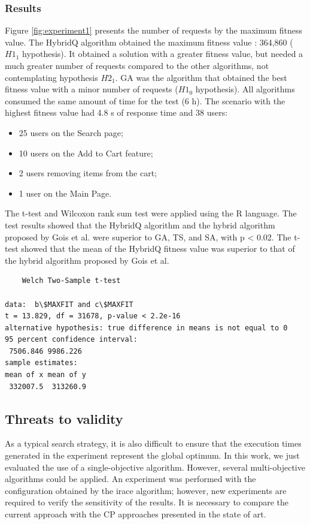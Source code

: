 \documentclass{bmcart}
\begin{document}
\subsubsection{Results}

Figure \ref{fig:experiment1} presents the number of requests by the maximum fitness value. The HybridQ algorithm obtained the maximum fitness value : 364,860 ($H1_{1}$ hypothesis). It obtained a solution with a greater fitness value, but needed a much greater number of requests compared to the other algorithms, not contemplating hypothesis $H2_{1}$. GA was the algorithm that obtained the best fitness value with a minor number of requests ($H1_{0}$ hypothesis). All algorithms consumed the same amount of time for the test (6 h). The scenario with the highest fitness value had 4.8 s of response time and 38 users:

\begin{itemize}
\item 25 users on the Search page;
\item 10 users on the Add to Cart feature;
\item 2 users removing items from the cart;
\item 1 user on the Main Page. 
\end{itemize}

The t-test and Wilcoxon rank sum test were applied using the R language. The test results showed that the HybridQ algorithm and the hybrid algorithm proposed by Gois et al. were superior to GA, TS, and SA, with p < 0.02. The t-test showed that the mean of the HybridQ fitness value was superior to that of the hybrid algorithm proposed by Gois et al.

\begin{lstlisting}
	Welch Two-Sample t-test

data:  b\$MAXFIT and c\$MAXFIT
t = 13.829, df = 31678, p-value < 2.2e-16
alternative hypothesis: true difference in means is not equal to 0
95 percent confidence interval:
 7506.846 9986.226
sample estimates:
mean of x mean of y 
 332007.5  313260.9 

\end{lstlisting}



\subsection{Threats to validity}

As a typical search strategy, it is also difficult to ensure that the execution times generated in the experiment represent the global optimum. In this work, we just evaluated the use of a single-objective algorithm. However, several multi-objective algorithms could be applied.  An experiment was performed with the configuration obtained by the irace algorithm; however, new experiments are required to verify the sensitivity of the results. It is necessary to compare the current approach with the CP approaches presented in the state of art.
\end{document}
